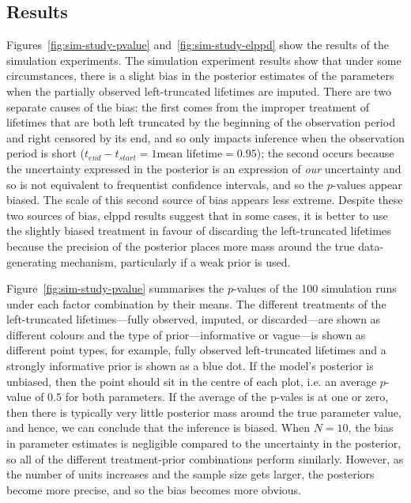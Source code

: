 \subsection{Results} \label{subsec:sim-experiment-results}

Figures~\ref{fig:sim-study-pvalue} and~\ref{fig:sim-study-elppd} show the results of the simulation experiments. The simulation experiment results show that under some circumstances, there is a slight bias in the posterior estimates of the parameters when the partially observed left-truncated lifetimes are imputed. There are two separate causes of the bias: the first comes from the improper treatment of lifetimes that are both left truncated by the beginning of the observation period and right censored by its end, and so only impacts inference when the observation period is short ($t_{end} - t_{start} = 1 \text{mean lifetime} = 0.95$); the second occurs because the uncertainty expressed in the posterior is an expression of \textit{our} uncertainty and so is not equivalent to frequentist confidence intervals, and so the $p$-values appear biased. The scale of this second source of bias appears less extreme. Despite these two sources of bias, elppd results suggest that in some cases, it is better to use the slightly biased treatment in favour of discarding the left-truncated lifetimes because the precision of the posterior places more mass around the true data-generating mechanism, particularly if a weak prior is used.

Figure~\ref{fig:sim-study-pvalue} summarises the $p$-values of the 100 simulation runs under each factor combination by their means. The different treatments of the left-truncated lifetimes---fully observed, imputed, or discarded---are shown as different colours and the type of prior---informative or vague---is shown as different point types, for example, fully observed left-truncated lifetimes and a strongly informative prior is shown as a blue dot. If the model's posterior is unbiased, then the point should sit in the centre of each plot, i.e. an average $p$-value of $0.5$ for both parameters. If the average of the p-vales is at one or zero, then there is typically very little posterior mass around the true parameter value, and hence, we can conclude that the inference is biased. When $N = 10$, the bias in parameter estimates is negligible compared to the uncertainty in the posterior, so all of the different treatment-prior combinations perform similarly. However, as the number of units increases and the sample size gets larger, the posteriors become more precise, and so the bias becomes more obvious.

